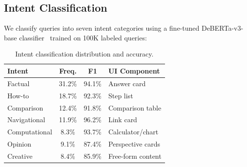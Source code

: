 \subsection{Intent Classification}

We classify queries into seven intent categories using a fine-tuned DeBERTa-v3-base classifier~\cite{he2021debertav3} trained on 100K labeled queries:

\begin{table}[H]
\centering
\small
\begin{tabular}{lccl}
\toprule
\textbf{Intent} & \textbf{Freq.} & \textbf{F1} & \textbf{UI Component} \\
\midrule
Factual & 31.2\% & 94.1\% & Answer card \\
How-to & 18.7\% & 92.3\% & Step list \\
Comparison & 12.4\% & 91.8\% & Comparison table \\
Navigational & 11.9\% & 96.2\% & Link card \\
Computational & 8.3\% & 93.7\% & Calculator/chart \\
Opinion & 9.1\% & 87.4\% & Perspective cards \\
Creative & 8.4\% & 85.9\% & Free-form content \\
\bottomrule
\end{tabular}
\caption{Intent classification distribution and accuracy.}
\label{tab:intent}
\end{table}

